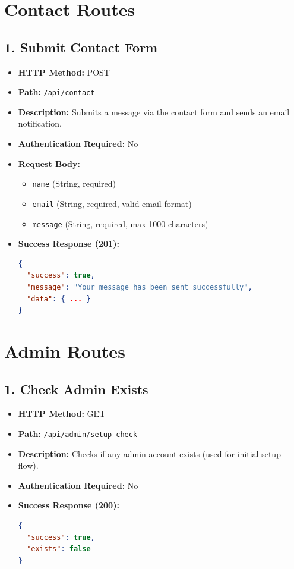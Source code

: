 \documentclass[12pt,a4paper]{article}
\begin{document}
\section{Contact Routes}

\subsection{1. Submit Contact Form}
\begin{itemize}
    \item \textbf{HTTP Method:} POST
    \item \textbf{Path:} \texttt{/api/contact}
    \item \textbf{Description:} Submits a message via the contact form and sends an email notification.
    \item \textbf{Authentication Required:} No
    \item \textbf{Request Body:}
    \begin{itemize}
        \item \texttt{name} (String, required)
        \item \texttt{email} (String, required, valid email format)
        \item \texttt{message} (String, required, max 1000 characters)
    \end{itemize}
    \item \textbf{Success Response (201):}
\begin{lstlisting}[language=json]
{
  "success": true,
  "message": "Your message has been sent successfully",
  "data": { ... }
}
\end{lstlisting}
\end{itemize}

\section{Admin Routes}

\subsection{1. Check Admin Exists}
\begin{itemize}
    \item \textbf{HTTP Method:} GET
    \item \textbf{Path:} \texttt{/api/admin/setup-check}
    \item \textbf{Description:} Checks if any admin account exists (used for initial setup flow).
    \item \textbf{Authentication Required:} No
    \item \textbf{Success Response (200):}
\begin{lstlisting}[language=json]
{
  "success": true,
  "exists": false
}
\end{lstlisting}
\end{itemize}
\end{document}
